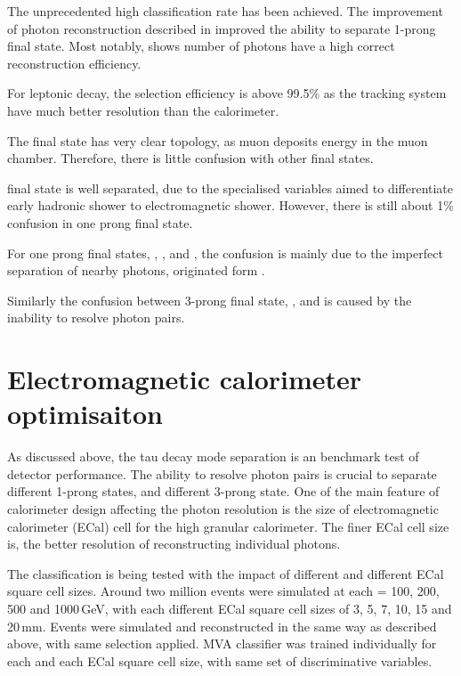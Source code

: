 The unprecedented high classification rate has been achieved. The improvement of photon reconstruction described in \Section{} improved the ability to separate 1-prong final state. Most notably,  \Figure{} shows number of photons have a high correct reconstruction efficiency.

For leptonic decay, the selection efficiency is above 99.5\% as the tracking system have much better resolution than the calorimeter.

The \decayMuonShort final state has very clear topology, as muon deposits energy in the muon chamber. Therefore, there is little confusion with other final states.

\decayElectronShort final state is well separated, due to the specialised variables aimed to differentiate early hadronic shower to electromagnetic shower. However, there is still about 1\% confusion in one prong final state.

For one prong final states, \decayPionShort, \decayRhoShortest, and \decayAiPhotonShortest, the confusion is mainly due to the imperfect separation of nearby photons, originated form \Ppizero. 


Similarly the confusion between 3-prong final state, \decayAiPionShortest, and \decayThreePionPhotonShort is caused by the inability to resolve photon pairs.

\section{Electromagnetic calorimeter  optimisaiton}

As discussed above, the tau decay mode separation is an benchmark test of detector performance. The ability to resolve photon pairs is crucial to separate different 1-prong states, and different 3-prong state. One of the main feature of calorimeter design affecting the photon resolution is the size of electromagnetic calorimeter (ECal) cell for the high granular calorimeter. The finer ECal cell size is, the better resolution of reconstructing individual photons.


The classification is being tested with the impact of different \sqrtS and different ECal square cell sizes. Around two million events were simulated at each \sqrtS = 100, 200, 500 and 1000\,GeV, with each different ECal square cell sizes of 3, 5, 7, 10, 15 and 20\,mm. Events were simulated and reconstructed in the same way as described above, with same selection applied. MVA classifier was trained individually for each \sqrtS and each ECal square cell size, with same set of discriminative variables.

